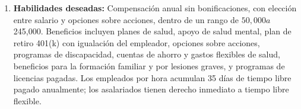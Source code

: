 \documentclass[12pt]{article}
\begin{document}
\begin{enumerate}
                    \item \textbf{Habilidades deseadas:}
                        Compensación anual sin bonificaciones, con elección entre salario y opciones sobre acciones, dentro de un rango de $50,000 a $245,000. Beneficios incluyen planes de salud, apoyo de salud mental, plan de retiro 401(k) con igualación del empleador, opciones sobre acciones, programas de discapacidad, cuentas de ahorro y gastos flexibles de salud, beneficios para la formación familiar y por lesiones graves, y programas de licencias pagadas. Los empleados por hora acumulan 35 días de tiempo libre pagado anualmente; los asalariados tienen derecho inmediato a tiempo libre flexible.

                \end{enumerate}
\end{document}
